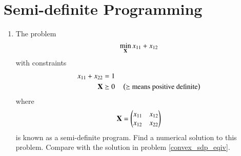 \documentclass[journal,12pt,twocolumn]{IEEEtran}
\renewcommand\thesection{\arabic{section}}
\begin{document}
\section{Semi-definite Programming}
\begin{enumerate}[label=\thesection.\arabic*,ref=\thesection.\theenumi]


\item
%
\label{ch3_convex_ch2}
The problem
\begin{equation}
\min_{\mathbf{X}} x_{11} + x_{12}
\end{equation}
%	
with constraints
\begin{align}
x_{11} + x_{22} &= 1 \\	
\mathbf{X}
& \succeq 0 \quad  \left(\text{$\succeq$ means positive definite}\right)
\end{align}
%
where
\begin{equation}
\mathbf{X}=
\begin{pmatrix}
x_{11} & x_{12} \\
x_{12} & x_{22}
\end{pmatrix} 
\end{equation}
%
is known as a semi-definite program.  Find a numerical solution to this problem. Compare with the solution 
in problem  \ref{convex_sdp_eqiv}.
\label{prob:cvxopt}


\end{enumerate}
\end{document}
